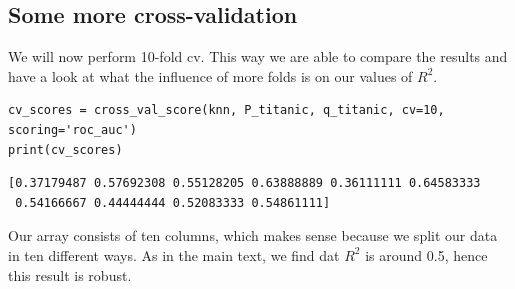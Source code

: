 \documentclass[11pt]{article}
\begin{document}
\newpage
\subsection{Some more cross-validation}
\label{sec:orgcf14bd3}
We will now perform 10-fold cv. This way we are able to compare the results and have a look at what the influence of more folds is on our values of \(R^{2}\).

\begin{verbatim}
cv_scores = cross_val_score(knn, P_titanic, q_titanic, cv=10, scoring='roc_auc')
print(cv_scores)
\end{verbatim}

\begin{verbatim}
[0.37179487 0.57692308 0.55128205 0.63888889 0.36111111 0.64583333
 0.54166667 0.44444444 0.52083333 0.54861111]

\end{verbatim}



Our array consists of ten columns, which makes sense because we split our data in ten different ways. As in the main text, we find dat \(R^2\) is around 0.5, hence this result is robust. 
\end{document}
